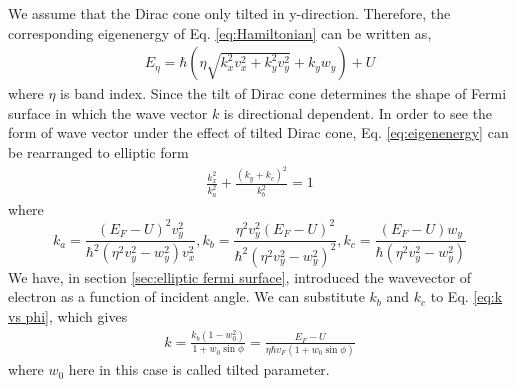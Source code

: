     We assume that the Dirac cone only tilted in y-direction. Therefore, the corresponding eigenenergy of Eq. \ref{eq:Hamiltonian} can be written as,
    \begin{align} \label{eq:eigenenergy}
        E_\eta=\hbar (\eta \sqrt{k_x^2 v_x^2+k_y^2 v_y^2 }+k_y w_y)+U
    \end{align}
    where $\eta$ is band index. Since the tilt of Dirac cone determines the shape of Fermi surface in which the wave vector $k$ is directional dependent. 
    In order to see the form of wave vector under the effect of tilted Dirac cone, Eq. \ref{eq:eigenenergy} can be rearranged to elliptic form
    \begin{align}
        \frac{k_x^2}{k_a^2} + \frac{(k_y+k_c)^2}{k_b^2} = 1
    \end{align}
    where
    $$
    k_a = \frac{(E_F-U)^2 v_y^2}{\hbar^2 (\eta^2 v_y^2 - w_y^2) v_x^2}, k_b = \frac{\eta^2 v_y^2 (E_F-U)^2}{\hbar^2 (\eta^2 v_y^2 - w_y^2)^2},
    k_c = \frac{(E_F - U)w_y}{\hbar (\eta^2 v_y^2 - w_y^2)}
    $$
    We have, in section \ref{sec:elliptic fermi surface}, introduced the wavevector of electron as a function of incident angle.
    We can substitute $k_b$ and $k_c$ to Eq. \ref{eq:k vs phi}, which gives
    \begin{align} \label{eq:k vs phi final}
        k = \frac{k_b(1-w_0^2)}{1+w_0 \sin{\phi}} = \frac{E_F - U}{\eta \hbar v_F (1+w_0 \sin{\phi})}
    \end{align}
    where $w_0$ here in this case is called tilted parameter.
